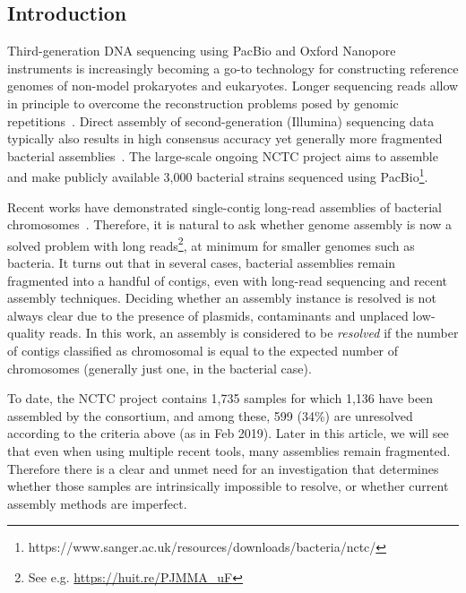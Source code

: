 \documentclass[./main.tex]{subfiles}
\newcommand{\modafterreview}[1]{#1}
\begin{document}
\subsection{Introduction}
Third-generation DNA sequencing using PacBio and Oxford Nanopore instruments is increasingly becoming a go-to technology for constructing reference genomes of non-model prokaryotes and eukaryotes. Longer sequencing reads allow in principle to overcome the reconstruction problems posed by genomic repetitions~\citep{tse}. Direct assembly of second-generation (Illumina) sequencing data typically also results in \modafterreview{high consensus accuracy} yet generally more fragmented bacterial assemblies~\citep{spades}. 
The large-scale ongoing NCTC project aims to assemble and make publicly available 3,000 bacterial strains sequenced using PacBio\footnote{https://www.sanger.ac.uk/resources/downloads/bacteria/nctc/}.


Recent works have demonstrated single-contig long-read assemblies of bacterial chromosomes~\citep{1chr1contig,loman2015complete}. 
Therefore, it is natural to ask whether genome assembly is now a solved problem with long reads\footnote{See e.g. \url{https://huit.re/PJMMA_uF}}, at minimum for smaller genomes such as bacteria. It turns out that in several cases, bacterial assemblies remain fragmented into a handful of contigs, even with long-read sequencing and recent assembly techniques. 
Deciding whether an assembly instance is resolved is not always clear due to the presence of plasmids, contaminants and unplaced low-quality reads. In this work, an assembly is considered to be \emph{resolved} if the number of contigs classified as chromosomal is equal to the expected number of chromosomes (generally \modafterreview{just} one, in the bacterial case).

 To date, the NCTC project contains 1,735 samples for which 1,136 have been assembled by the consortium, and among these, 599 (34\%) are unresolved according to the criteria above (as in Feb 2019). Later in this article, we will see that even when using multiple recent tools, many assemblies remain fragmented. Therefore there is a clear and unmet need for an investigation that determines whether those samples are intrinsically impossible to resolve, or whether current assembly methods are imperfect.
\end{document}
